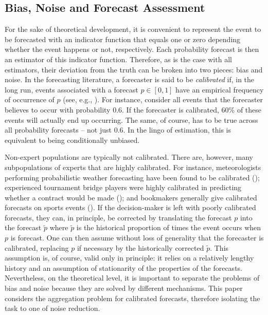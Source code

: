 \documentclass[11pt]{article}
\theoremstyle{definition}
\theoremstyle{definition}
\def\pt{\tilde{p}}
\begin{document}
\subsection{Bias, Noise and Forecast Assessment}
\label{BiasNoise}
For the sake of theoretical development, it is convenient to represent the event to be forecasted with an
indicator function that equals one or zero depending whether the event
happens or not, respectively. Each probability forecast is then an
estimator of this indicator function.  Therefore, as is the case with
all estimators, their deviation from the truth can be broken into two
pieces: bias and noise.  In the forecasting literature, a forecaster
is said to be {\em calibrated} if, in the long run, events associated
with a forecast $p \in [0,1]$ have an empirical frequency of
occurrence of $p$ (see, e.g., \citealt{degroot1983comparison}). For
instance, consider all events that the forecaster believes to occur
with probability 0.6. If the forecaster is calibrated, 60\% of
these events will actually end up occurring. The same, of course, has
to be true across all probability forecasts -- not just 0.6.  
In the lingo of
estimation, this is equivalent to being conditionally unbiased.

Non-expert populations are typically not calibrated. There are,
however, many subpopulations of experts that are highly
calibrated. For instance, meteorologists performing probabilistic
weather forecasting have been found to be calibrated
(\citealt{murphy1977reliability}); experienced tournament bridge
players were highly calibrated in predicting whether a contract would
be made (\citealt{keren1987facing}); and bookmakers generally give
calibrated forecasts on sports events (\citealt{dowie1976efficiency,
yates1985conditional}). If the decision-maker is left with poorly
calibrated forecasts, they can, in principle, be corrected by
translating the forecast $p$ into the forecast $\pt$ where $\pt$ is
the historical proportion of times the event occurs when $p$ is
forecast.  One can then assume without loss of generality that the
forecaster is calibrated, replacing $p$ if necessary by the
historically corrected $\pt$. This assumption is, of course, valid
only in principle: it relies on a relatively lengthy history and an
assumption of stationarity of the properties of the forecasts.  
Nevertheless, on the
theoretical level, it is important to separate the problems of bias
and noise because they are solved by different mechanisms.  This
paper considers the aggregation problem for calibrated forecasts,
therefore isolating the task to one of noise reduction.
\end{document}
